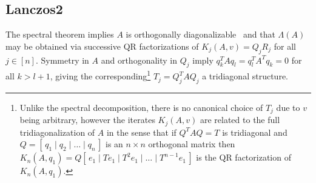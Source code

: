 \documentclass[10pt]{article}
\numberwithin{equation}{section}
\newcommand{\+}{%
	\raisebox{0.18ex}{\scaleobj{0.55}{+}}
}
\theoremstyle{definition}
\theoremstyle{definition}
\begin{document}
\subsection*{Lanczos2}
The spectral theorem implies $A$ is orthogonally diagonalizable~\cite{bhatia2013matrix} and that $\Lambda(A)$ may be obtained via successive QR factorizations of $K_j(A,v) = Q_j R_j$ for all $j \in [n]$.
Symmetry in $A$ and orthogonality in $Q_j$ imply $q_k^T A q_l = q_l^T A^T q_k = 0$ for all $k > l + 1$, giving the corresponding\footnote{Unlike the spectral decomposition, there is no canonical choice of $T_j$ due to $v$ being arbitrary, however the iterates $K_j(A,v)$ are related to the full tridiagonalization of $A$ in the sense that if $Q^T A Q = T$ is tridiagonal and $Q= [\, q_1 \mid q_2 \mid \dots \mid q_n \,]$ is an $n \times n$ orthogonal matrix then $K_n(A, q_1) = Q[ \, e_1 \mid T e_1 \mid T^2 e_1 \mid \dots \mid T^{n-1} e_1 \, ]$ is the QR factorization of $K_n(A, q_1)$.} $T_j = Q_j^T A Q_j$ a tridiagonal structure.
\end{document}
